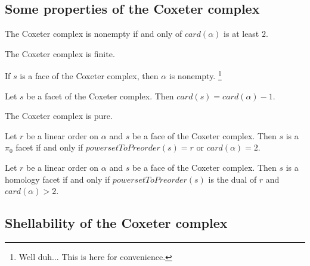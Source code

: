 \subsection{Some properties of the Coxeter complex}

\begin{sublemma}
The Coxeter complex is nonempty if and only of $card(\alpha)$ is at least $2$.

\end{sublemma}

\begin{sublemma}
The Coxeter complex is finite.

\end{sublemma}

\begin{sublemma}
If $s$ is a face of the Coxeter complex, then $\alpha$ is nonempty.
\footnote{Well duh... This is here for convenience.}

\end{sublemma}

\begin{sublemma}
Let $s$ be a facet of the Coxeter complex. Then $card(s)=card(\alpha)-1$.

\end{sublemma}

\begin{sublemma}
The Coxeter complex is pure.

\end{sublemma}

\begin{sublemma}
Let $r$ be a linear order on $\alpha$ and $s$ be a face of the Coxeter complex. Then $s$ is a $\pi_0$ facet if and only if
$powersetToPreorder(s)=r$ or $card(\alpha)=2$.

\end{sublemma}

\begin{sublemma}
Let $r$ be a linear order on $\alpha$ and $s$ be a face of the Coxeter complex. Then $s$ is a homology facet if and only if
$powersetToPreorder(s)$ is the dual of $r$ and $card(\alpha)>2$.

\end{sublemma}


\subsection{Shellability of the Coxeter complex}

